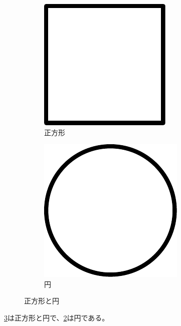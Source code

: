 \begin{figure}[ht]
  \centering
  \begin{subfigure}[t]{0.45\textwidth}
  \centering
    \includegraphics[width=0.8\linewidth]{examples/figures/square}
    \caption{正方形}\label{subfig:square}
  \end{subfigure}
  \quad
  \begin{subfigure}[t]{0.45\textwidth}
  \centering
    \includegraphics[width=0.8\linewidth]{examples/figures/circle}
    \caption{円}\label{subfig:circle}
  \end{subfigure}
  \caption{正方形と円}\label{fig:square-circle}
\end{figure}

\cref{fig:square-circle}は正方形と円で、\cref{subfig:circle}は円である。